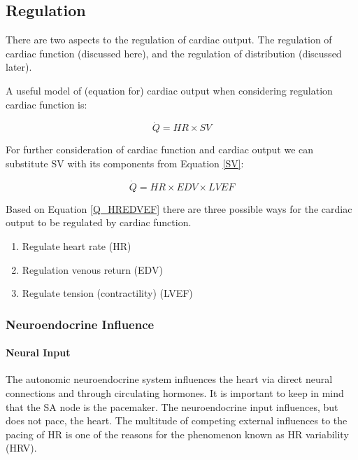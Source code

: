 \subsection{Regulation}

There are two aspects to the regulation of cardiac output. The regulation of cardiac function (discussed here), and the regulation of distribution (discussed later).

A useful model of (equation for) cardiac output when considering regulation cardiac function is: 

\begin{equation}
    \dot{Q} = HR \times SV
    \label{Q_HRSV}
\end{equation}

For further consideration of cardiac function and cardiac output we can substitute SV with its components from Equation \ref{SV}:

\begin{equation}
    \dot{Q} = HR \times EDV \times LVEF
    \label{Q_HREDVEF}
\end{equation}


Based on Equation \ref{Q_HREDVEF} there are three possible ways for the cardiac output to be regulated by cardiac function.

\begin{enumerate}
    \item Regulate heart rate (HR)
    \item Regulation venous return (EDV)
    \item Regulate tension (contractility) (LVEF) 
\end{enumerate}

\subsubsection{Neuroendocrine Influence}

\paragraph{Neural Input}

The autonomic neuroendocrine system influences the heart via direct neural connections and through circulating hormones. It is important to keep in mind that the SA node is the pacemaker. The neuroendocrine input influences, but does not pace, the heart. The multitude of competing external influences to the pacing of HR is one of the reasons for the phenomenon known as HR variability (HRV). 

